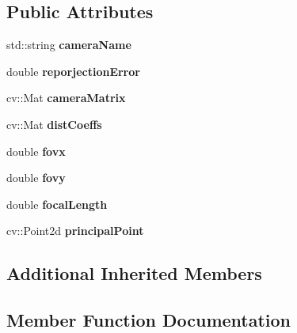 \subsection*{Public Attributes}
\begin{DoxyCompactItemize}
\item 
std\+::string {\bfseries camera\+Name}\hypertarget{classCameraCal_a6b5eb4c36c863701cff34e9ba2d6f64b}{}\label{classCameraCal_a6b5eb4c36c863701cff34e9ba2d6f64b}

\item 
double {\bfseries reporjection\+Error}\hypertarget{classCameraCal_a7f1f8fbe6975378cc8ffec8338e379ba}{}\label{classCameraCal_a7f1f8fbe6975378cc8ffec8338e379ba}

\item 
cv\+::\+Mat {\bfseries camera\+Matrix}\hypertarget{classCameraCal_abe31c21ecea3289f2e103acb6cc1208a}{}\label{classCameraCal_abe31c21ecea3289f2e103acb6cc1208a}

\item 
cv\+::\+Mat {\bfseries dist\+Coeffs}\hypertarget{classCameraCal_a55d562412415e341ef76bcb9c80f67f4}{}\label{classCameraCal_a55d562412415e341ef76bcb9c80f67f4}

\item 
double {\bfseries fovx}\hypertarget{classCameraCal_ae2db6a3f823cc793317eae41c8681065}{}\label{classCameraCal_ae2db6a3f823cc793317eae41c8681065}

\item 
double {\bfseries fovy}\hypertarget{classCameraCal_a2348222df74031059d634835d5325411}{}\label{classCameraCal_a2348222df74031059d634835d5325411}

\item 
double {\bfseries focal\+Length}\hypertarget{classCameraCal_ae821e874698bde0d95f99bd80d9891af}{}\label{classCameraCal_ae821e874698bde0d95f99bd80d9891af}

\item 
cv\+::\+Point2d {\bfseries principal\+Point}\hypertarget{classCameraCal_a41774b2252dc7e1517728b579d0a48db}{}\label{classCameraCal_a41774b2252dc7e1517728b579d0a48db}

\end{DoxyCompactItemize}
\subsection*{Additional Inherited Members}


\subsection{Member Function Documentation}
